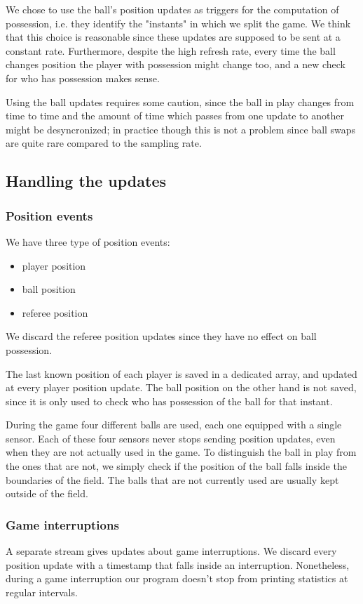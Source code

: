 \documentclass[a4paper]{article}
\begin{document}
We chose to use the ball's position updates as triggers for the computation of possession, i.e. they identify the "instants" in which we split the game. We think that this choice is reasonable since these updates are supposed to be sent at a constant rate. Furthermore, despite the high refresh rate, every time the ball changes position the player with possession might change too, and a new check for who has possession makes sense.

Using the ball updates requires some caution, since the ball in play changes from time to time and the amount of time which passes from one update to another might be desyncronized; in practice though this is not a problem since ball swaps are quite rare compared to the sampling rate.

\subsection{Handling the updates}
\subsubsection{ Position events}

We have three type of position events:
\begin{itemize}
	\item player position
  \item ball position
  \item  referee position
\end{itemize}

We discard the referee position updates since they have no effect on ball possession.

The last known position of each player is saved in a dedicated array, and updated at every player position update. The ball position on the other hand is not saved, since it is only used to check who has possession of the ball for that instant.

During the game four different balls are used, each one equipped with a single sensor. Each of these four sensors never stops sending position updates, even when they are not actually used in the game. To distinguish the ball in play from the ones that are not, we simply check if the position of the ball falls inside the boundaries of the field. The balls that are not currently used are usually kept outside of the field.

\subsubsection{ Game interruptions}
A separate stream gives updates about game interruptions. We discard every position update with a timestamp that falls inside an interruption. Nonetheless, during a game interruption our program doesn't stop from printing statistics at regular intervals.
\end{document}
